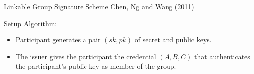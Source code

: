 \begin{frame}{Linkable Group Signature Scheme}
Chen, Ng and Wang (2011)

Setup Algorithm:
\begin{itemize}
\item Participant generates a pair $(sk,pk)$ of secret and public keys.
\item The issuer gives the participant the credential $(A,B,C)$ that authenticates the participant's public key as member of the group.
\end{itemize}

\end{frame}